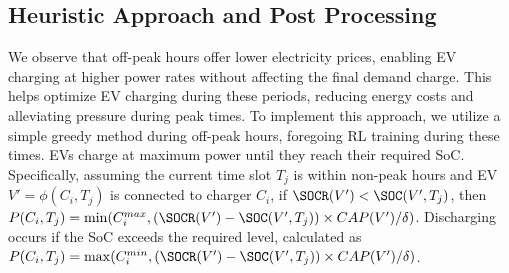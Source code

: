 \subsection{Heuristic Approach and Post Processing}
We observe that off-peak hours offer lower electricity prices, enabling EV charging at higher power rates without affecting the final demand charge. This helps optimize EV charging during these periods, reducing energy costs and alleviating pressure during peak times. To implement this approach, we utilize a simple greedy method during off-peak hours, foregoing RL training during these times. EVs charge at maximum power until they reach their required SoC. Specifically, assuming the current time slot $T_j$ is within non-peak hours and EV $V' = \phi(C_i, T_j)$ is connected to charger $C_i$, if $\SOCR(V') < \SOC(V', T_j)$, then $P(C_i, T_j) = \min(C^{max}_i, (\SOCR(V') - \SOC(V', T_j)) \times {CAP}(V') / \delta)$. Discharging occurs if the SoC exceeds the required level, calculated as $P(C_i, T_j) = \max(C^{min}_i, (\SOCR(V') - \SOC(V', T_j)) \times {CAP}(V') / \delta)$.


